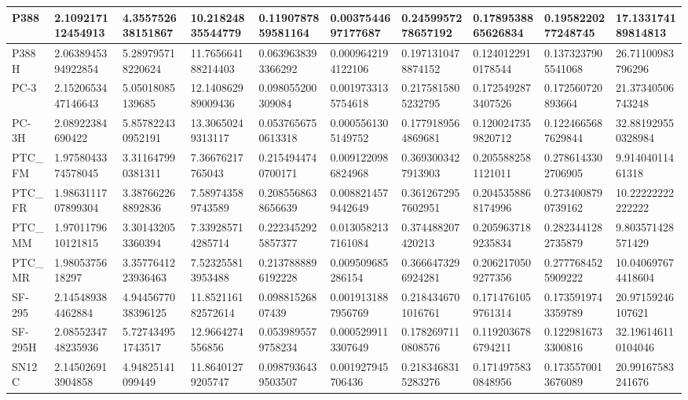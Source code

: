 \documentclass{article}
\begin{document}
\begin{table}[!ht]
\begin{tabular}{|l|l|l|l|l|l|l|l|l|l|}
        P388 & 2.109217112454913 & 4.355752638151867 & 10.21824835544779 & 0.1190787859581164 & 0.0037544697177687 & 0.2459957278657192 & 0.1789538865626834 & 0.1958220277248745 & 17.133174189814813 \\ \hline
        P388H & 2.0638945394922854 & 5.289795718220624 & 11.765664188214403 & 0.0639638393366292 & 0.0009642194122106 & 0.1971310478874152 & 0.1240122910178544 & 0.1373237905541068 & 26.71100983796296 \\ \hline
        PC-3 & 2.1520653447146643 & 5.05018085139685 & 12.140862989009436 & 0.098055200309084 & 0.0019733135754618 & 0.2175815805232795 & 0.1725492873407526 & 0.172560720893664 & 21.37340506743248 \\ \hline
        PC-3H & 2.08922384690422 & 5.857822430952191 & 13.30650249313117 & 0.0537656750613318 & 0.0005561305149752 & 0.1779189564869681 & 0.1200247359820712 & 0.1224665687629844 & 32.881929550328984 \\ \hline
        PTC\_FM & 1.9758043374578045 & 3.311647990381311 & 7.36676217765043 & 0.2154944740700171 & 0.0091220986824968 & 0.3693003427913903 & 0.2055882581121011 & 0.2786143302706905 & 9.91404011461318 \\ \hline
        PTC\_FR & 1.9863111707899304 & 3.387662268892836 & 7.589743589743589 & 0.2085568638656639 & 0.0088214579442649 & 0.3612672957602951 & 0.2045358868174996 & 0.2734008790739162 & 10.22222222222222 \\ \hline
        PTC\_MM & 1.9701179610121815 & 3.301432053360394 & 7.339285714285714 & 0.2223452925857377 & 0.0130582137161084 & 0.374488207420213 & 0.2059637189235834 & 0.2823441282735879 & 9.803571428571429 \\ \hline
        PTC\_MR & 1.9805375618297 & 3.3577641223936463 & 7.523255813953488 & 0.2137888896192228 & 0.009509685286154 & 0.3666473296924281 & 0.2062170509277356 & 0.2777684525909222 & 10.040697674418604 \\ \hline
        SF-295 & 2.145489384462884 & 4.9445677038396125 & 11.852116182572614 & 0.09881526807439 & 0.0019131887956769 & 0.2184346701016761 & 0.1714761059761314 & 0.1735919743359789 & 20.97159246107621 \\ \hline
        SF-295H & 2.0855234748235936 & 5.727434951743517 & 12.9664274556856 & 0.0539895579758234 & 0.0005299113307649 & 0.1782697110808576 & 0.1192036786794211 & 0.1229816733300816 & 32.196146110104046 \\ \hline
        SN12C & 2.145026913904858 & 4.94825141099449 & 11.86401279205747 & 0.0987936439503507 & 0.001927945706436 & 0.2183468315283276 & 0.1714975830848956 & 0.1735570013676089 & 20.99167583241676 \\ \hline

\end{tabular}
\end{table}
\end{document}
